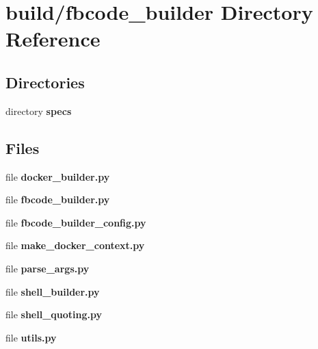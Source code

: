 \section{build/fbcode\+\_\+builder Directory Reference}
\label{dir_6071a7d6ab300e76324abe656ad15885}
\subsection*{Directories}
\begin{DoxyCompactItemize}
\item 
directory {\bf specs}
\end{DoxyCompactItemize}
\subsection*{Files}
\begin{DoxyCompactItemize}
\item 
file {\bf docker\+\_\+builder.\+py}
\item 
file {\bf fbcode\+\_\+builder.\+py}
\item 
file {\bf fbcode\+\_\+builder\+\_\+config.\+py}
\item 
file {\bf make\+\_\+docker\+\_\+context.\+py}
\item 
file {\bf parse\+\_\+args.\+py}
\item 
file {\bf shell\+\_\+builder.\+py}
\item 
file {\bf shell\+\_\+quoting.\+py}
\item 
file {\bf utils.\+py}
\end{DoxyCompactItemize}
